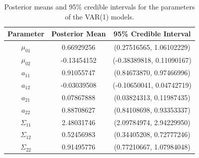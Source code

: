 \begin{table}[H]
    \centering
    \begin{tabular}{|c|c|c|}
        \hline
        \textbf{Parameter } & \textbf{Posterior Mean } & \textbf{95\% Credible Interval } \\
        \hline
        $\mu_{01}$     &  0.66929256 &  (0.27516565, 1.06102229) \\
        $\mu_{02}$     & -0.13454152 &  (-0.38389818, 0.11090167) \\
        $a_{11}$     &  0.91055747 &  (0.84673870, 0.97466996) \\
        $a_{12}$     & -0.03039508 &  (-0.10650041, 0.04742719) \\
        $a_{21}$     &  0.07867888 &  (0.03824313, 0.11987435) \\
        $a_{22}$     &  0.88708627 &  (0.84108698, 0.93353337) \\
        $\Sigma_{11}$ &  2.48031746 &  (2.09784974, 2.94229950) \\
        $\Sigma_{12}$ &  0.52456983 &  (0.34405208, 0.72777246) \\
        $\Sigma_{22}$ &  0.91495776 &  (0.77210667, 1.07984048) \\
        \hline
    \end{tabular}
    \caption{Posterior means and 95\% credible intervals for the parameters of the VAR(1) models.}
    \label{tab:VAR1_posteriors}
\end{table}